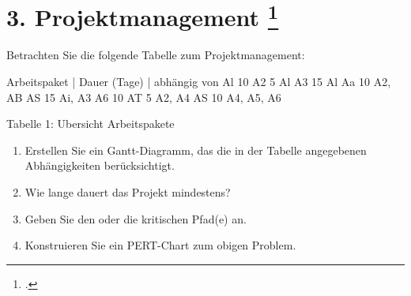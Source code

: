 \documentclass{lehramt-informatik-aufgabe}
\begin{document}
\section{3. Projektmanagement
\footcite[Thema 1 Teilaufgabe 1 Aufgabe 3]{examen:46116:2015:09}}

Betrachten Sie die folgende Tabelle zum Projektmanagement:

Arbeitspaket | Dauer (Tage) | abhängig von
Al 10
A2 5 Al
A3 15 Al
Aa 10 A2, AB
AS 15 Ai, A3
A6 10
AT 5 A2, A4
AS 10 A4, A5, A6

Tabelle 1: Ubersicht Arbeitspakete

\begin{enumerate}


\item Erstellen Sie ein Gantt-Diagramm, das die in der Tabelle
angegebenen Abhängigkeiten berücksichtigt.


\item Wie lange dauert das Projekt mindestens?


\item Geben Sie den oder die kritischen Pfad(e) an.


\item Konstruieren Sie ein PERT-Chart zum obigen Problem.

\end{enumerate}
\end{document}

